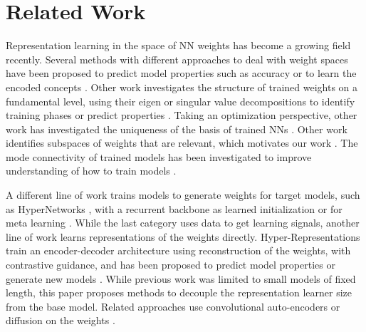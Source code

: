 \section{Related Work}

Representation learning in the space of NN weights has become a growing field recently. 
Several methods with different approaches to deal with weight spaces have been proposed to predict model properties such as accuracy \citep{unterthinerPredictingNeuralNetwork2020,eilertsenClassifyingClassifierDissecting2020, andreisSetbasedNeuralNetwork2023, zhangNeuralNetworksAre2023} or to learn the encoded concepts \citep{ashkenaziNeRNLearningNeural2022, deluigiDeepLearningImplicit2023}. 
%
Other work investigates the structure of trained weights on a fundamental level, using their eigen or singular value decompositions to identify training phases or predict properties \citep{martinTraditionalHeavyTailedSelf2019,MM20_SDM,martinPredictingTrendsQuality2021,martinImplicitSelfregularizationDeep2021, YTHx22_TR, mellerSingularValueRepresentation2023}.
Taking an optimization perspective, other work has investigated the uniqueness of the basis of trained NNs \citep{ainsworthGitReBasinMerging2022, brownPrivilegedConvergentBases2023}. Other work identifies subspaces of weights that are relevant, which motivates our work \citep{bentonLossSurfaceSimplexes2021, lucasMonotonicLinearInterpolation2021, wortsmanLearningNeuralNetwork2021, fortLargeScaleStructure2019}. The mode connectivity of trained models has been investigated to improve understanding of how to train models \citep{draxlerEssentiallyNoBarriers2018, nguyenConnectedSublevelSets2019, frankleLinearModeConnectivity2019}. 

A different line of work trains models to generate weights for target models, such as HyperNetworks \citep{haHyperNetworks2016, nguyenHyperVAEMinimumDescription2019, zhangGraphHyperNetworksNeural2019, knyazevParameterPredictionUnseen2021,knyazevCanWeScale2023b,kofinas2024graph}, with a recurrent backbone \citep{wangCompactOptimalDeep2023} as learned initialization \citep{dauphinMetaInitInitializingLearning2019} or for meta learning \citep{finnModelAgnosticMetaLearningFast2017,zhmoginovHyperTransformerModelGeneration2022,navaMetaLearningClassifierFree2022}.
While the last category uses data to get learning signals, another line of work learns representations of the weights directly. Hyper-Representations train an encoder-decoder architecture using reconstruction of the weights, with contrastive guidance, and has been proposed to predict model properties \citep{schurholtSelfSupervisedRepresentationLearning2021} or generate new models \citep{schurholtHyperRepresentationsPreTrainingTransfer2022, schurholtHyperRepresentationsGenerativeModels2022}. While previous work was limited to small models of fixed length, this paper proposes methods to decouple the representation learner size from the base model. Related approaches use convolutional auto-encoders \citep{berardiLearningSpaceDeep2022} or diffusion on the weights \citep{peeblesLearningLearnGenerative2022}.
